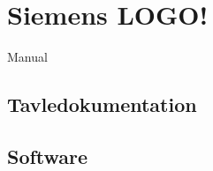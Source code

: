 \section{Siemens LOGO!}

\cite{logo_sm} Manual

\subsection{Tavledokumentation}
\subsection{Software}